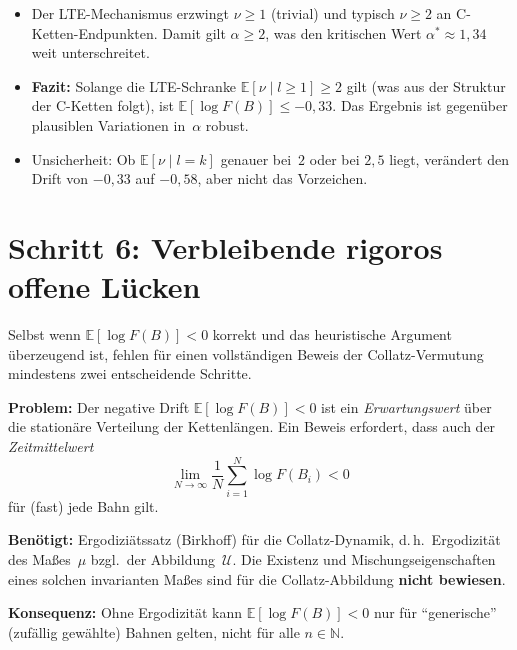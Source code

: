 \documentclass[12pt,a4paper]{article}
\newcommand{\N}{\mathbb{N}}
\newcommand{\E}{\mathbb{E}}
\newcommand{\logF}{\log F(B)}
\begin{document}
\begin{tcolorbox}[warnung, title={Interpretation der Sensitivitätsanalyse}]
\begin{itemize}[noitemsep]
  \item Der LTE-Mechanismus erzwingt $\nu \geq 1$ (trivial) und typisch
        $\nu \geq 2$ an C-Ketten-Endpunkten.
        Damit gilt $\alpha \geq 2$, was den kritischen Wert $\alpha^* \approx 1{,}34$
        weit unterschreitet.
  \item \textbf{Fazit:} Solange die LTE-Schranke $\E[\nu \mid l{\geq}1] \geq 2$
        gilt (was aus der Struktur der C-Ketten folgt), ist $\E[\logF] \leq -0{,}33$.
        Das Ergebnis ist gegenüber plausiblen Variationen in~$\alpha$ robust.
  \item Unsicherheit: Ob $\E[\nu \mid l{=}k]$ genauer bei~$2$ oder bei
        $2{,}5$ liegt, verändert den Drift von $-0{,}33$ auf $-0{,}58$,
        aber nicht das Vorzeichen.
\end{itemize}
\end{tcolorbox}

\section{Schritt 6: Verbleibende rigoros offene Lücken}
\label{sec:offene_luecken}

Selbst wenn $\E[\logF] < 0$ korrekt und das heuristische Argument
überzeugend ist, fehlen für einen vollständigen Beweis der Collatz-Vermutung
mindestens zwei entscheidende Schritte.

\begin{tcolorbox}[lücke, title={Offene Lücke 1: Ergodizitätsargument}]
\textbf{Problem:} Der negative Drift $\E[\logF] < 0$ ist ein
\emph{Erwartungswert} über die stationäre Verteilung der Kettenlängen.
Ein Beweis erfordert, dass auch der \emph{Zeitmittelwert}
\[
  \lim_{N\to\infty} \frac{1}{N}\sum_{i=1}^{N} \log F(B_i) < 0
\]
für (fast) jede Bahn gilt.

\textbf{Benötigt:} Ergodiziätssatz (Birkhoff) für die Collatz-Dynamik,
d.\,h.\ Ergodizität des Maßes~$\mu$ bzgl.\ der Abbildung~$\mathcal{U}$.
Die Existenz und Mischungseigenschaften eines solchen invarianten Maßes
sind für die Collatz-Abbildung \textbf{nicht bewiesen}.

\textbf{Konsequenz:} Ohne Ergodizität kann $\E[\logF] < 0$ nur für
``generische'' (zufällig gewählte) Bahnen gelten, nicht für alle
$n \in \N$.
\end{tcolorbox}
\end{document}
